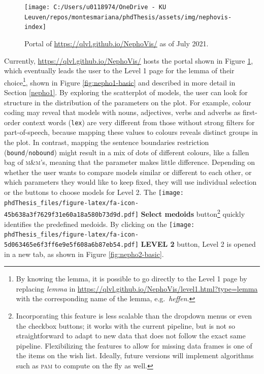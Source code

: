 \documentclass[
]{book}
\begin{document}
\begin{figure}
\texttt{[image: C:/Users/u0118974/OneDrive - KU Leuven/repos/montesmariana/phdThesis/assets/img/nephovis-index]} \caption{Portal of \url{https://qlvl.github.io/NephoVis/} as of July 2021.}\label{fig:nepho-index}
\end{figure}

Currently, \url{https://qlvl.github.io/NephoVis/} hosts the portal shown in Figure \ref{fig:nepho-index}, which eventually leads the user to the Level 1 page for the lemma of their choice\footnote{By knowing the lemma, it is possible to go directly to the Level 1 page by replacing \emph{lemma} in \url{https://qlvl.github.io/NephoVis/level1.html?type=lemma} with the corresponding name of the lemma, e.g.~\emph{heffen}.}, shown in Figure \ref{fig:nepho1-basic} and described in more detail in Section \ref{nepho1}. By exploring the scatterplot of models, the user can look for structure in the distribution of the parameters on the plot.
For example, colour coding may reveal that models with nouns, adjectives, verbs and adverbs as first-order context words (\texttt{lex}) are very different from those without strong filters for part-of-speech, because mapping these values to colours reveals distinct groups in the plot. In contrast, mapping the sentence boundaries restriction (\texttt{bound}/\texttt{nobound}) might result in a mix of dots of different colours, like a fallen bag of \textsc{m\&m}'s, meaning that the parameter makes little difference. Depending on whether the user wants to compare models similar or different to each other, or which parameters they would like to keep fixed, they will use individual selection or the buttons to choose models for Level 2. The
\texttt{[image: phdThesis\_files/figure-latex/fa-icon-45b638a3f7629f31e60a18a580b73d9d.pdf]} \textbf{Select medoids}
button\footnote{Incorporating this feature is less scalable than the dropdown menus or even the checkbox buttons; it works with the current pipeline, but is not so straightforward to adapt to new data that does not follow the exact same pipeline. Flexibilizing the features to allow for missing data frames is one of the items on the wish list. Ideally, future versions will implement algorithms such as \textsc{pam} to compute on the fly as well.} quickly identifies the predefined medoids. By clicking on the
\texttt{[image: phdThesis\_files/figure-latex/fa-icon-5d063465e6f3ff6e9e5f608a6b87eb54.pdf]} \textbf{LEVEL 2} button,
Level 2 is opened in a new tab, as shown in Figure \ref{fig:nepho2-basic}.
\end{document}
